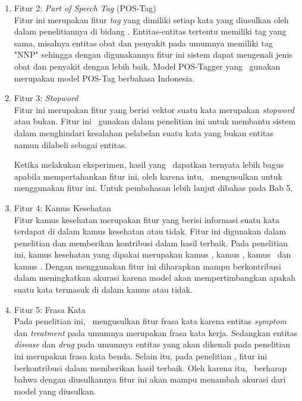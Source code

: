 \begin{enumerate}
	\item Fitur 2: \textit{Part of Speech Tag} (POS-Tag)\\
	Fitur ini merupakan fitur \textit{tag} yang dimiliki setiap kata yang diusulkan oleh \cite{abacha2011medical} dalam penelitiannya di bidang \mer. Entitas-entitas tertentu memiliki tag yang sama, misalnya entitas obat dan penyakit pada umumnya memiliki tag "NNP" sehingga dengan digunakannya fitur ini sistem dapat mengenali jenis obat dan penyakit dengan lebih baik. Model POS-Tagger yang \saya~gunakan merupakan model POS-Tag berbahasa Indonesia.
	
	\item Fitur 3: \textit{Stopword}\\
	Fitur ini merupakan fitur yang berisi vektor suatu kata merupakan \textit{stopword} atau bukan. Fitur ini \saya~gunakan dalam penelitian ini untuk membantu sistem dalam menghindari kesalahan pelabelan suatu kata yang bukan entitas namun dilabeli sebagai entitas.
	
	Ketika melakukan eksperimen, hasil yang \saya~dapatkan ternyata lebih bagus apabila mempertahankan fitur ini, oleh karena intu, \saya~mengusulkan untuk menggunakan fitur ini. Untuk pembahasan lebih lanjut dibahas pada Bab 5.
	
	\item Fitur 4: Kamus Kesehatan\\
	Fitur kamus kesehatan merupakan fitur yang berisi informasi suatu kata terdapat di dalam kamus kesehatan atau tidak. Fitur ini digunakan dalam penelitian \cite{skripsiKakRadit} dan memberikan kontribusi dalam hasil terbaik. Pada penelitian ini, kamus kesehatan yang dipakai merupakan kamus \disease, kamus \symptom, kamus \drug~dan kamus \treatment. Dengan menggunakan fitur ini diharapkan mampu berkontribusi dalam meningkatkan akurasi karena model akan mempertimbangkan apakah suatu kata termasuk di dalam kamus atau tidak. 
	
	\item Fitur 5: Frasa Kata\\
	Pada penelitian ini, \saya~mengusulkan fitur frasa kata karena entitas \textit{symptom} dan \textit{treatment}  pada umumnya merupakan frasa kata kerja. Sedangkan entitas \textit{disease} dan \textit{drug} pada umumnya entitas yang akan dikenali pada penelitian ini merupakan frasa kata benda. Selain itu, pada penelitian \cite{skripsiKakRadit}, fitur ini berkontribusi dalam memberikan hasil terbaik. Oleh karena itu, \saya~berharap bahwa dengan diusulkannya fitur ini akan mampu menambah akurasi dari model yang diusulkan.
	

\end{enumerate}
